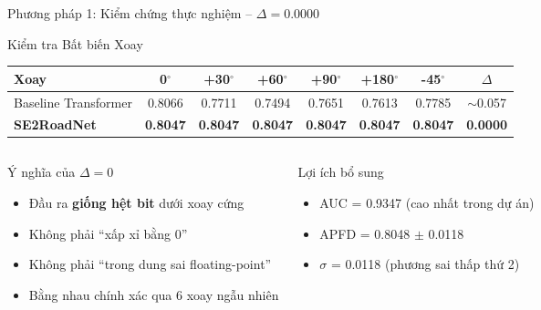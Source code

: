 \documentclass[aspectratio=169,10pt]{beamer}
\begin{document}
\begin{frame}{Phương pháp 1: Kiểm chứng thực nghiệm -- $\Delta = 0.0000$}
\begin{block}{Kiểm tra Bất biến Xoay}
\scriptsize
\begin{center}
\begin{tabular}{l c c c c c c c}
\toprule
\textbf{Xoay} & 0$^\circ$ & +30$^\circ$ & +60$^\circ$ & +90$^\circ$ & +180$^\circ$ & -45$^\circ$ & $\Delta$ \\
\midrule
Baseline Transformer & 0.8066 & 0.7711 & 0.7494 & 0.7651 & 0.7613 & 0.7785 & \alert{$\sim$0.057} \\
\rowcolor{success!15}
\textbf{SE2RoadNet} & \textbf{0.8047} & \textbf{0.8047} & \textbf{0.8047} & \textbf{0.8047} & \textbf{0.8047} & \textbf{0.8047} & \cellcolor{success!25}\textbf{0.0000} \\
\bottomrule
\end{tabular}
\end{center}
\end{block}

\begin{columns}[T]
\begin{exampleblock}{Ý nghĩa của $\Delta = 0$}
\scriptsize
\begin{itemize}
  \item Đầu ra \textbf{giống hệt bit} dưới xoay cứng
  \item Không phải ``xấp xỉ bằng 0''
  \item Không phải ``trong dung sai floating-point''
  \item \alert{Bằng nhau chính xác qua 6 xoay ngẫu nhiên}
\end{itemize}
\end{exampleblock}

\begin{block}{Lợi ích bổ sung}
\scriptsize
\begin{itemize}
  \item AUC = 0.9347 (cao nhất trong dự án)
  \item APFD = 0.8048 $\pm$ 0.0118
  \item $\sigma$ = 0.0118 (phương sai thấp thứ 2)
\end{itemize}
\end{block}
\end{columns}
\end{frame}
\end{document}

